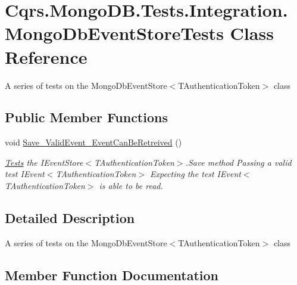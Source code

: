 \hypertarget{classCqrs_1_1MongoDB_1_1Tests_1_1Integration_1_1MongoDbEventStoreTests}{}\section{Cqrs.\+Mongo\+D\+B.\+Tests.\+Integration.\+Mongo\+Db\+Event\+Store\+Tests Class Reference}
\label{classCqrs_1_1MongoDB_1_1Tests_1_1Integration_1_1MongoDbEventStoreTests}


A series of tests on the Mongo\+Db\+Event\+Store$<$\+T\+Authentication\+Token$>$ class  


\subsection*{Public Member Functions}
\begin{DoxyCompactItemize}
\item 
void \hyperlink{classCqrs_1_1MongoDB_1_1Tests_1_1Integration_1_1MongoDbEventStoreTests_a399ae37cf9f492b3e55d1480f97b1520_a399ae37cf9f492b3e55d1480f97b1520}{Save\+\_\+\+Valid\+Event\+\_\+\+Event\+Can\+Be\+Retreived} ()
\begin{DoxyCompactList}\small\item\em \hyperlink{namespaceCqrs_1_1MongoDB_1_1Tests}{Tests} the I\+Event\+Store$<$\+T\+Authentication\+Token$>$.\+Save method Passing a valid test I\+Event$<$\+T\+Authentication\+Token$>$ Expecting the test I\+Event$<$\+T\+Authentication\+Token$>$ is able to be read. \end{DoxyCompactList}\end{DoxyCompactItemize}


\subsection{Detailed Description}
A series of tests on the Mongo\+Db\+Event\+Store$<$\+T\+Authentication\+Token$>$ class 



\subsection{Member Function Documentation}
\mbox{\label{classCqrs_1_1MongoDB_1_1Tests_1_1Integration_1_1MongoDbEventStoreTests_a399ae37cf9f492b3e55d1480f97b1520_a399ae37cf9f492b3e55d1480f97b1520}} 
